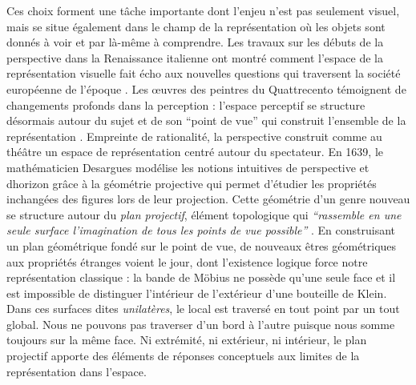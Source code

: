 Ces choix forment une t\^ache importante dont l{\textquoteright}enjeu n{\textquoteright}est pas seulement visuel, mais se situe également dans le champ de la représentation o\`u les objets sont donnés à voir et par là-m\^eme à comprendre. Les travaux sur les débuts de la perspective dans la Renaissance italienne ont montré comment l{\textquoteright}espace de la représentation visuelle fait écho aux nouvelles questions qui traversent la société européenne de l{\textquoteright}époque \citep{Raynaud2005}. Les {\oe}uvres des peintres du Quattrecento témoignent de changements profonds dans la perception : l{\textquoteright}espace perceptif se structure désormais autour du sujet et de son {\textquotedblleft}point de vue{\textquotedblright} qui construit l{\textquoteright}ensemble de la représentation \citep{Damisch1999}. Empreinte de rationalité, la perspective construit comme au thé\^atre un espace de représentation centré autour du spectateur. En 1639, le mathématicien Desargues modélise les notions intuitives de perspective et d{\textquotesingle}horizon gr\^ace à la géométrie projective qui permet d{\textquoteright}étudier les propriétés inchangées des figures lors de leur projection. Cette géométrie d{\textquoteright}un genre nouveau se structure autour du \textit{plan projectif}, élément topologique qui \textit{{\textquotedblleft}rassemble en une seule surface l{\textquoteright}imagination de tous les points de vue possible{\textquotedblright} }\citep{Petit1999}. En construisant un plan géométrique fondé sur le point de vue, de nouveaux \^etres géométriques aux propriétés étranges voient le jour, dont l{\textquoteright}existence logique force notre représentation classique : la bande de M\"obius ne possède qu{\textquoteright}une seule face et il est impossible de distinguer l{\textquoteright}intérieur de l{\textquoteright}extérieur d{\textquoteright}une bouteille de Klein. Dans ces surfaces dites \textit{unilatères}, le local est traversé en tout point par un tout global. Nous ne pouvons pas traverser d'un bord à l'autre puisque nous somme toujours sur la m\^eme face. Ni extrémité, ni extérieur, ni intérieur, le plan projectif apporte des éléments de réponses conceptuels aux limites de la représentation dans l{\textquoteright}espace.

